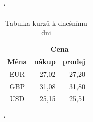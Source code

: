 \documentclass[11pt,a4paper]{article}
\begin{document}
\begin{table}[h]
\catcode`

    \centering
    \begin{tabular}{|c|r|r|}
    \hline
  &\multicolumn{2}{c|}{\textbf{Cena}} \\
\cline{2-3}
\textbf{Měna}    & \textbf{nákup} & \textbf{prodej} \\
\hline
EUR & 27,02 & 27,20 \\
GBP & 31,08 & 31,80 \\
USD & 25,15 & 25,51 \\
\hline
\end{tabular}
    \caption{Tabulka kurzů k dnešnímu dni}
    \label{tab:currency}
\end{table}

\begin{table}[hb]
\catcode`


\end{table}
\end{document}
